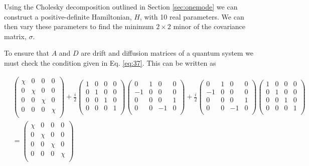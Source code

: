 \documentclass[11pt,a4paper]{article}
\numberwithin{equation}{section}
\begin{document}
	Using the Cholesky decomposition outlined in Section \ref{sec:onemode} we can construct a positive-definite Hamiltonian, $H$, with 10 real parameters. We can then vary these parameters to find the minimum $2 \times 2$ minor of the covariance matrix, $\sigma$.
	
	To ensure that $A$ and $D$ are drift and diffusion matrices of a quantum system we must check the condition given in Eq. \ref{eq:37}. This can be written as

	\begin{align*}
	&\begin{pmatrix}
	\chi & 0 & 0 & 0\\
	0 & \chi & 0 & 0\\
	0 & 0 & \chi & 0 \\
	0 & 0 & 0 & \chi\\
	\end{pmatrix} + \frac{i}{2}\begin{pmatrix}
	1 & 0 & 0 & 0\\
	0 & 1 & 0 & 0\\
	0 & 0 & 1 & 0 \\
	0 & 0 & 0 & 1\\
	\end{pmatrix}\begin{pmatrix}
	0 & 1 & 0 & 0 \\
	-1 & 0 & 0 & 0\\
	0 & 0 & 0 & 1\\
	0 & 0 & -1 & 0\\
	\end{pmatrix} + \frac{i}{2}\begin{pmatrix}
	0 & 1 & 0 & 0 \\
	-1 & 0 & 0 & 0\\
	0 & 0 & 0 & 1\\
	0 & 0 & -1 & 0\\
	\end{pmatrix}\begin{pmatrix}
	1 & 0 & 0 & 0\\
	0 & 1 & 0 & 0\\
	0 & 0 & 1 & 0 \\
	0 & 0 & 0 & 1\\
	\end{pmatrix}&\\
	&= \begin{pmatrix}
	\chi & 0 & 0 & 0\\
	0 & \chi & 0 & 0\\
	0 & 0 & \chi & 0 \\
	0 & 0 & 0 & \chi\\

\end{pmatrix}
\end{align*}
\end{document}
